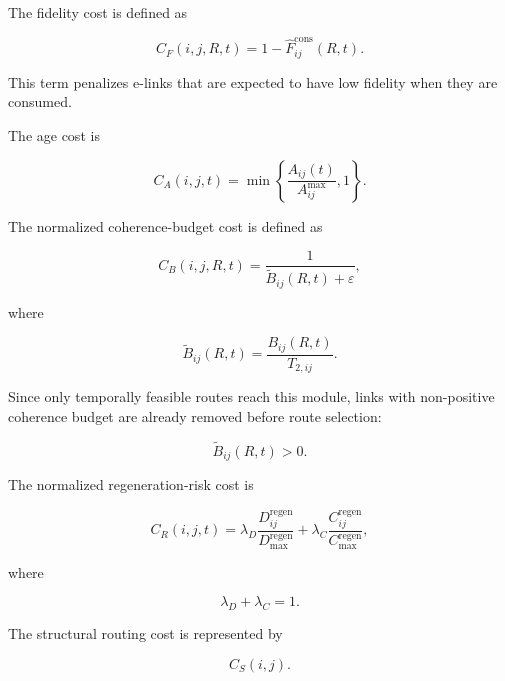 The fidelity cost is defined as

\begin{equation}
    C_F(i,j,R,t)
    =
    1
    -
    \widehat{F}_{ij}^{\mathrm{cons}}(R,t).
\end{equation}

This term penalizes e-links that are expected to have low fidelity when they are consumed.

The age cost is

\begin{equation}
    C_A(i,j,t)
    =
    \min
    \left\{
    \frac{
    A_{ij}(t)
    }{
    A_{ij}^{\max}
    },
    1
    \right\}.
\end{equation}

The normalized coherence-budget cost is defined as

\begin{equation}
    C_B(i,j,R,t)
    =
    \frac{
    1
    }{
    \widetilde{B}_{ij}(R,t)
    +
    \varepsilon
    },
\end{equation}

where

\begin{equation}
    \widetilde{B}_{ij}(R,t)
    =
    \frac{
    B_{ij}(R,t)
    }{
    T_{2,ij}
    }.
\end{equation}

Since only temporally feasible routes reach this module, links with non-positive coherence budget are already removed before route selection:

\begin{equation}
    \widetilde{B}_{ij}(R,t)
    >
    0.
\end{equation}

The normalized regeneration-risk cost is

\begin{equation}
    C_R(i,j,t)
    =
    \lambda_D
    \frac{
    D_{ij}^{\mathrm{regen}}
    }{
    D_{\max}^{\mathrm{regen}}
    }
    +
    \lambda_C
    \frac{
    C_{ij}^{\mathrm{regen}}
    }{
    C_{\max}^{\mathrm{regen}}
    },
\end{equation}

where

\begin{equation}
    \lambda_D+\lambda_C=1.
\end{equation}

The structural routing cost is represented by

\begin{equation}
    C_S(i,j).
\end{equation}

